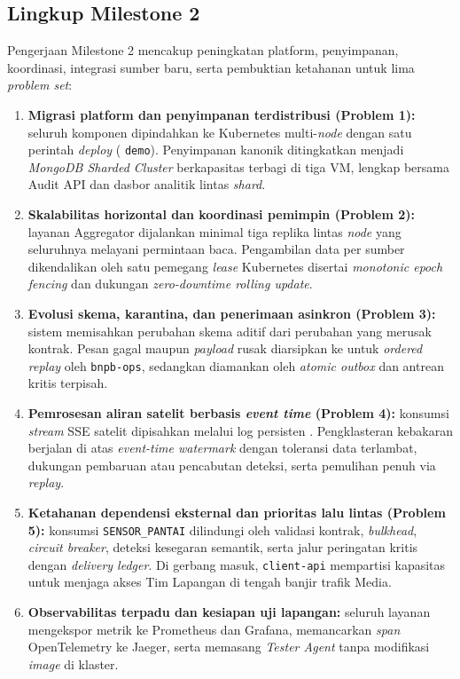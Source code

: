 \subsection{Lingkup Milestone 2}

Pengerjaan Milestone 2 mencakup peningkatan platform, penyimpanan, koordinasi, integrasi sumber baru, serta pembuktian ketahanan untuk lima \textit{problem set}:

\begin{enumerate}
  \item \textbf{Migrasi platform dan penyimpanan terdistribusi (Problem 1):} seluruh komponen dipindahkan ke Kubernetes multi-\textit{node} dengan satu perintah \textit{deploy} ( \texttt{demo}). Penyimpanan kanonik ditingkatkan menjadi \textit{MongoDB Sharded Cluster} berkapasitas terbagi di tiga VM, lengkap bersama Audit API dan dasbor analitik lintas \textit{shard}.
  \item \textbf{Skalabilitas horizontal dan koordinasi pemimpin (Problem 2):} layanan Aggregator dijalankan minimal tiga replika lintas \textit{node} yang seluruhnya melayani permintaan baca. Pengambilan data per sumber dikendalikan oleh satu pemegang \textit{lease} Kubernetes disertai \textit{monotonic epoch fencing} dan dukungan \textit{zero-downtime rolling update}.
  \item \textbf{Evolusi skema, karantina, dan penerimaan asinkron (Problem 3):} sistem memisahkan perubahan skema aditif dari perubahan yang merusak kontrak. Pesan gagal maupun \textit{payload} rusak diarsipkan ke  untuk \textit{ordered replay} oleh \texttt{bnpb-ops}, sedangkan  diamankan oleh \textit{atomic outbox} dan antrean kritis terpisah.
  \item \textbf{Pemrosesan aliran satelit berbasis \textit{event time} (Problem 4):} konsumsi \textit{stream} SSE satelit dipisahkan melalui log persisten . Pengklasteran kebakaran berjalan di atas \textit{event-time watermark} dengan toleransi data terlambat, dukungan pembaruan atau pencabutan deteksi, serta pemulihan penuh via \textit{replay}.
  \item \textbf{Ketahanan dependensi eksternal dan prioritas lalu lintas (Problem 5):} konsumsi \texttt{SENSOR\_PANTAI} dilindungi oleh validasi kontrak, \textit{bulkhead}, \textit{circuit breaker}, deteksi kesegaran semantik, serta jalur peringatan kritis dengan \textit{delivery ledger}. Di gerbang masuk, \texttt{client-api} mempartisi kapasitas untuk menjaga akses Tim Lapangan di tengah banjir trafik Media.
  \item \textbf{Observabilitas terpadu dan kesiapan uji lapangan:} seluruh layanan mengekspor metrik ke Prometheus dan Grafana, memancarkan \textit{span} OpenTelemetry ke Jaeger, serta memasang \textit{Tester Agent} tanpa modifikasi \textit{image} di klaster.
\end{enumerate}

